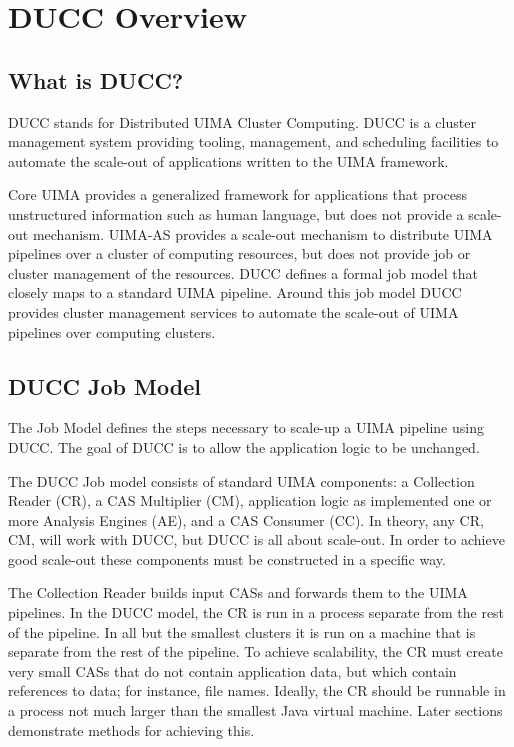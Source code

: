 \chapter{DUCC Overview}

    \section{What is DUCC?}

    DUCC stands for Distributed UIMA Cluster Computing. DUCC is a cluster management system
    providing tooling, management, and scheduling facilities to automate the scale-out of
    applications written to the UIMA framework.

    Core UIMA provides a generalized framework for applications that process unstructured
    information such as human language, but does not provide a scale-out mechanism. UIMA-AS provides
    a scale-out mechanism to distribute UIMA pipelines over a cluster of computing resources, but
    does not provide job or cluster management of the resources. DUCC defines a formal job model
    that closely maps to a standard UIMA pipeline. Around this job model DUCC provides cluster
    management services to automate the scale-out of UIMA pipelines over computing clusters.

    \section{DUCC Job Model}

    The Job Model defines the steps necessary to scale-up a UIMA pipeline using DUCC.  The goal of
    DUCC is to allow the application logic to be unchanged.

    The DUCC Job model consists of standard UIMA components: a Collection Reader (CR), a CAS
    Multiplier (CM), application logic as implemented one or more Analysis Engines (AE), and a CAS
    Consumer (CC).  In theory, any CR, CM, will work with DUCC, but DUCC is all about scale-out.  In
    order to achieve good scale-out these components must be constructed in a specific way.

    The Collection Reader builds input CASs and forwards them to the UIMA pipelines.  In the DUCC
    model, the CR is run in a process separate from the rest of the pipeline. In all but the
    smallest clusters it is run on a machine that is separate from the rest of the pipeline.  To
    achieve scalability, the CR must create very small CASs that do not contain application data,
    but which contain references to data; for instance, file names.  Ideally, the CR should be
    runnable in a process not much larger than the smallest Java virtual machine.  Later sections
    demonstrate methods for achieving this.

